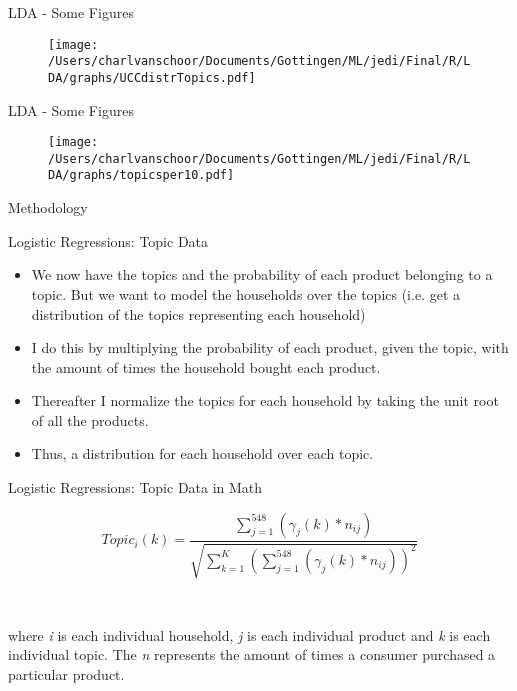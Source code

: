\documentclass{beamer}
\begin{document}
\begin{frame}{LDA - Some Figures}

\begin{figure}
\texttt{[image: /Users/charlvanschoor/Documents/Gottingen/ML/jedi/Final/R/LDA/graphs/UCCdistrTopics.pdf]}
\end{figure}

\end{frame}

\begin{frame}{LDA - Some Figures}

\begin{figure}
\texttt{[image: /Users/charlvanschoor/Documents/Gottingen/ML/jedi/Final/R/LDA/graphs/topicsper10.pdf]}
\end{figure}

\end{frame}







\begin{frame}{Methodology}
\begin{block}{Logistic Regressions: Topic Data}
\begin{itemize}
\item We now have the topics and the probability of each product belonging to a topic. But we want to model the households over the topics (i.e. get a distribution of the topics representing each household)
\item I do this by multiplying the probability of each product, given the topic, with the amount of times the household bought each product. 
\item Thereafter I normalize the topics for each household by taking the unit root of all the products. 
\item Thus, a distribution for each household over each topic. 
\end{itemize}
\end{block}
\end{frame}

\begin{frame}{Logistic Regressions: Topic Data in Math}


\[Topi{c_i}(k) = \frac{{\sum\limits_{j = 1}^{548} {({\gamma _j}(k)*{n_{ij}})} }}{{\sqrt {\sum\limits_{k = 1}^K {{{\left( {\sum\limits_{j = 1}^{548} {({\gamma _j}(k)*{n_{ij}})} } \right)}^2}} } }}\]

\

where \textit{i} is each individual household, \textit{j} is each individual product and \textit{k} is each individual topic. The \textit{n} represents the amount of times a consumer purchased a particular product. 

\end{frame}
\end{document}
